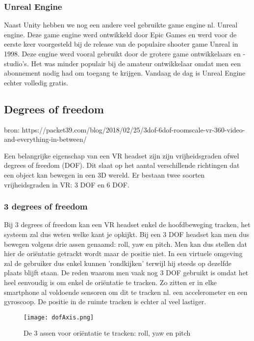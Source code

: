 \subsubsection{Unreal Engine}
Naast Unity hebben we nog een andere veel gebruikte game engine nl. Unreal engine. Deze game engine werd ontwikkeld door Epic Games en werd voor de eerste keer voorgesteld bij de release van de populaire shooter game Unreal in 1998. Deze engine werd vooral gebruikt door de grotere game ontwikkelaars en -studio's. Het was minder populair bij de amateur ontwikkelaar omdat men een abonnement nodig had om toegang te krijgen. Vandaag de dag is Unreal Engine echter volledig gratis.

\subsection{Degrees of freedom}

bron: https://packet39.com/blog/2018/02/25/3dof-6dof-roomscale-vr-360-video-and-everything-in-between/

Een belangrijke eigenschap van een VR headset zijn zijn vrijheidsgraden ofwel degrees of freedom (DOF). Dit slaat op het aantal verschillende richtingen dat een object kan bewegen in een 3D wereld. Er bestaan twee soorten vrijheidsgraden in VR: 3 DOF en 6 DOF. 

\subsubsection{3 degrees of freedom}
Bij 3 degrees of freedom kan een VR headset enkel de hoofdbeweging tracken, het systeem zal dus weten welke kant je opkijkt. Bij een 3 DOF headset kan men dus bewegen volgens drie assen genaamd: roll, yaw en pitch. Men kan dus stellen dat hier de oriëntatie getrackt wordt maar de positie niet. In een virtuele omgeving zal de gebruiker dus enkel kunnen 'rondkijken' terwijl hij steeds op dezelfde plaats blijft staan. De reden waarom men vaak nog 3 DOF gebruikt is omdat het heel eenvoudig is om enkel de oriëntatie te tracken. Zo zitten er in elke smartphone al voldoende sensoren om dit te tracken nl. een accelerometer en een gyroscoop. De positie in de ruimte tracken is echter al veel lastiger.

\begin{figure}[h]
    \centering
    \texttt{[image: dofAxis.png]}
    \caption{De 3 assen voor oriëntatie te tracken: roll, yaw en pitch}
\end{figure}

